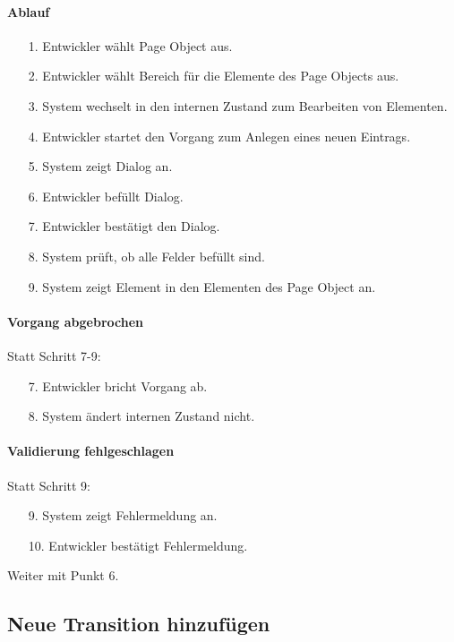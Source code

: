 \paragraph{Ablauf}

\begin{itemize}[itemsep=0pt]
\item[1.] Entwickler wählt Page Object aus.
\item[2.] Entwickler wählt Bereich für die Elemente des Page Objects aus. 
\item[3.] System wechselt in den internen Zustand zum Bearbeiten von Elementen.
\item[4.] Entwickler startet den Vorgang zum Anlegen eines neuen Eintrags.
\item[5.] System zeigt Dialog an. 
\item[6.] Entwickler befüllt Dialog.
\item[7.] Entwickler bestätigt den Dialog.
\item[8.] System prüft, ob alle Felder befüllt sind.
\item[9.] System zeigt Element in den Elementen des Page Object an.
\end{itemize}

\paragraph{Vorgang abgebrochen}
Statt Schritt 7-9:
\begin{itemize}[itemsep=0pt]
\item[7.] Entwickler bricht Vorgang ab. 
\item[8.] System ändert internen Zustand nicht. 
\end{itemize}

\paragraph{Validierung fehlgeschlagen}
Statt Schritt 9:
\begin{itemize}
\item[9.] System zeigt Fehlermeldung an. 
\item[10.] Entwickler bestätigt Fehlermeldung. 
\end{itemize}
Weiter mit Punkt 6. 


\subsection{Neue Transition hinzufügen}
\label{sec:neue_transition_hinzufügen}

